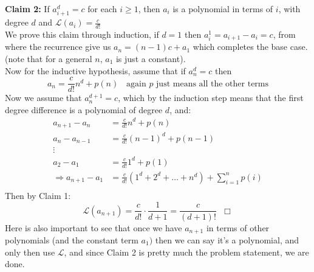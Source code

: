 \begin{solution}
    \textbf{Claim 2:} If $a_{i+1}^d = c$ for each $i \geq 1$, then $a_i$ is a polynomial in terms of $i$, with degree $d$ and $\mathcal{L}(a_i) = \frac{c}{d!}$ \\[2mm]
    We prove this claim through induction, if $d=1$ then $a^1_i = a_{i+1} - a_i = c$, from where the recurrence give us $a_n = (n-1)c + a_1$ which completes the base case. (note that for a general $n$, $a_1$ is just a constant). \\
    Now for the inductive hypothesis, assume that if $a_n^d = c$ then 
    $$a_n = \frac{c}{d!} n^d + p(n) \hspace{7pt} \text{ again $p$ just means all the other terms}$$
    Now we assume that $a_n^{d+1} = c$, which by the induction step means that the first degree difference is a polynomial of degree $d$, and:
    \begin{align*}
        a_{n+1} - a_n &= \frac{c}{d!} n^d + p(n) \\
        a_n - a_{n-1} &= \frac{c}{d!} (n-1)^d + p(n-1) \\
        \vdots \\ 
        a_2 - a_1 &=  \frac{c}{d!} 1^d + p(1) \\
        \Rightarrow a_{n+1} - a_1 &= \frac{c}{d!}(1^d + 2^d + \ldots + n^d) + \sum_{i=1}^n p(i) \\
    \end{align*}
    Then by Claim 1:
     $$ \mathcal{L} (a_{n+1}) = \frac{c}{d!} \cdot \frac{1}{d+1} = \frac{c}{(d+1)!}\hspace{7pt} \Box $$
    Here is also important to see that once we have $a_{n+1}$ in terms of other polynomials (and the constant term $a_1)$ then we can say it's a polynomial, and only then use $\mathcal{L}$, and since Claim 2 is pretty much the problem statement, we are done.
\end{solution}

